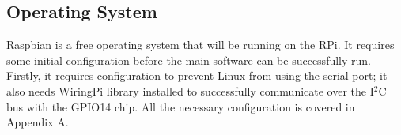 \subsection{Operating System}
Raspbian is a free operating system that will be running on the RPi. It requires some initial configuration before the main software can be successfully run. Firstly, it requires configuration to prevent Linux from using the serial port; it also needs WiringPi library \cite{WiringPi} installed to successfully communicate over the I$^2$C bus with the GPIO14 chip. All the necessary configuration is covered in Appendix A.  